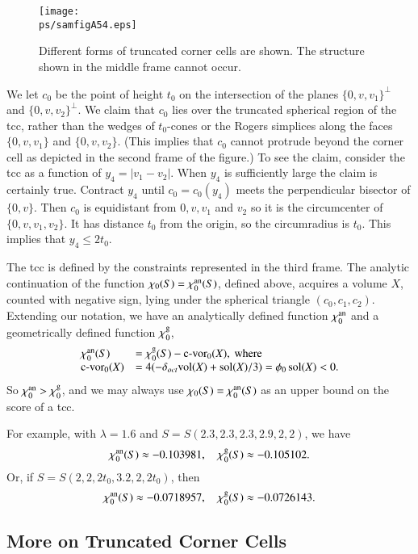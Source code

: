 \begin{figure}[htb]
  \centering
  \texttt{[image: \\ps/samfigA54.eps]}
  \caption{Different forms of truncated corner cells are shown.  The
  structure
  shown in the middle frame cannot occur.}
  \label{fig:chi-anal-vs-geom}
\end{figure}


We let $c_0$ be the point of height $t_0$ on the intersection of the
planes $\{0,v,v_1\}^\perp$ and $\{0,v,v_2\}^\perp$. We claim that $c_0$ lies
over the truncated spherical region of the tcc, rather than the wedges
of $t_0$-cones or the Rogers simplices along the faces $\{0,v,v_1\}$ and
$\{0,v,v_2\}$.  (This implies that $c_0$ cannot protrude beyond the corner
cell as depicted in the second frame of the figure.) To see the claim,
consider the tcc as a function of $y_4=|v_1-v_2|$. When $y_4$ is
sufficiently large the claim is certainly true.  Contract $y_4$ until
$c_0=c_0(y_4)$ meets the perpendicular bisector of $\{0,v\}$. Then $c_0$
is equidistant from $0,v,v_1$ and $v_2$ so it is the circumcenter of
$\{0,v,v_1,v_2\}$. It has distance $t_0$ from the origin, so the
circumradius is $t_0$. This implies that $y_4\le 2t_0$.

The tcc is defined by the constraints represented in the third
frame. The analytic continuation of the function
$\chi_0(S)=\chi_0^{\operatorname{an}}(S)$, defined above, acquires a volume $X$,
counted with negative sign, lying under the spherical triangle
$(c_0,c_1,c_2)$. Extending our notation, we have an analytically
defined function $\chi_0^{\operatorname{an}}$ and a geometrically defined function
$\chi_0^{\operatorname{g}}$,
    $$
    \begin{array}{lll}
    \chino^\anal(S) &= \chino^\geom(S)-\op{c-vor}_0(X), \text{\ where}\\
    \op{c-vor}_0(X) &= 4(-\doct\op{vol}(X) +\sol(X)/3) = \phi_0\sol(X) <0.
    \end{array}
    $$
So $\chi_0^{\operatorname{an}} >\chi_0^{\operatorname{g}}$, and we may always use
$\chi_0(S)=\chi_0^{\operatorname{an}}(S)$ as an upper bound on the score of a tcc.

For example, with $\lambda=1.6$ and $S = S(2.3,2.3,2.3,2.9,2,2)$, we
have
    $$\chi_0^{\operatorname{an}}(S)\approx -0.103981, \quad\chi_0^{\operatorname{g}}(S)\approx -0.105102.$$
Or, if $S=S(2,2,2t_0,3.2,2,2t_0)$, then
    $$\chi_0^{\operatorname{an}}(S)\approx -0.0718957, \quad
    \chi_0^{\operatorname{g}}(S)\approx -0.0726143.$$





\subsection{More on Truncated Corner Cells}

